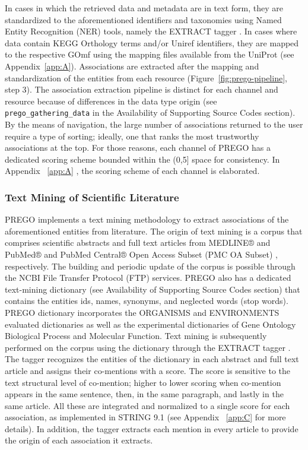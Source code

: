    In cases in which the retrieved data and metadata are in text form, they are standardized to the aforementioned identifiers and taxonomies using Named Entity Recognition (NER) tools, namely the EXTRACT tagger \citep{pafilis2016extract, jensen2016one}. 
   In cases where data contain KEGG Orthology terms and/or Uniref identifiers, they are mapped to the respective GOmf using the mapping files available from the UniProt (see Appendix~\ref{app:A}). 
   Associations are extracted after the mapping and standardization of the entities from each resource (Figure~\ref{fig:prego-pipeline}, step 3).
   The association extraction pipeline is distinct for each channel and resource because of differences in the data type origin (see \texttt{prego\_gathering\_data} in the Availability of Supporting Source Codes section). 
   By the means of navigation, the large number of associations returned to the user require a type of sorting; 
   ideally, one that ranks the most trustworthy associations at the top. 
   For those reasons, each channel of PREGO has a dedicated scoring scheme bounded within the (0,5] space for consistency. 
   In Appendix ~\ref{app:A} , the scoring scheme of each channel is elaborated.




   \subsubsection*{Text Mining of Scientific Literature}
   \label{subsec:prego-tm}

   PREGO implements a text mining methodology to extract associations of the aforementioned entities from literature. 
   The origin of text mining is a corpus that comprises scientific abstracts and full text articles from MEDLINE® and PubMed® and PubMed Central® Open Access Subset (PMC OA Subset) \citep{sayers2021database}, respectively. 
   The building and periodic update of the corpus is possible through the NCBI File Transfer Protocol (FTP) services. 
   PREGO also has a dedicated text-mining dictionary (see Availability of Supporting Source Codes section) that contains the entities ids, names, synonyms, and neglected words (stop words). 
   PREGO dictionary incorporates the ORGANISMS \citep{pafilis2013species} and ENVIRONMENTS \citep{pafilis2015environments} evaluated dictionaries as well as the experimental dictionaries of Gene Ontology Biological Process and Molecular Function.
   Text mining is subsequently performed on the corpus using the dictionary through the EXTRACT tagger \citep{pafilis2016extract, jensen2016one}. 
   The tagger recognizes the entities of the dictionary in each abstract and full text article and assigns their co-mentions with a score. 
   The score is sensitive to the text structural level of co-mention; higher to lower scoring when co-mention appears in the same sentence, then, in the same paragraph, and lastly in the same article. 
   All these are integrated and normalized to a single score for each association, as implemented in STRING 9.1 \citep{franceschini2012string} (see Appendix ~\ref{app:C} for more details). 
   In addition, the tagger extracts each mention in every article to provide the origin of each association it extracts.



